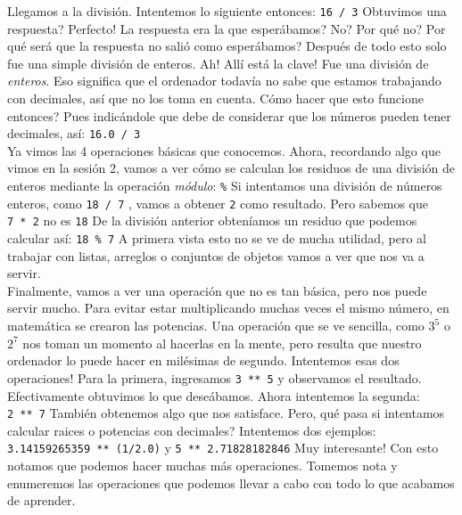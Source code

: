 \documentclass[10pt,letterpaper]{article}
\newcommand{\inlinecode}[1]{
\colorbox{light-gray}{\texttt{#1}}
}
\begin{document}
Llegamos a la divisi\'on. Intentemos lo siguiente entonces: \inlinecode{16\ /\ 3} Obtuvimos una respuesta? Perfecto! La respuesta era la que esper\'abamos? No? Por qu\'e no? Por qu\'e ser\'a que la respuesta no sali\'o como esper\'abamos? Despu\'es de todo esto solo fue una simple divisi\'on de enteros. Ah! All\'i est\'a la clave! Fue una divisi\'on de \emph{enteros}. Eso significa que el ordenador todav\'ia no sabe que estamos trabajando con decimales, as\'i que no los toma en cuenta. C\'omo hacer que esto funcione entonces? Pues indic\'andole que debe de considerar que los n\'umeros pueden tener decimales, as\'i: \inlinecode{16.0\ /\ 3}\\

Ya vimos las 4 operaciones b\'asicas que conocemos. Ahora, recordando algo que vimos en la sesi\'on 2, vamos a ver c\'omo se calculan los residuos de una divisi\'on de enteros mediante la operaci\'on \emph{m\'odulo}: \inlinecode{\%} Si intentamos una divisi\'on de n\'umeros enteros, como \inlinecode{18\ /\ 7}, vamos a obtener \inlinecode{2} como resultado. Pero sabemos que \inlinecode{7\ *\ 2} no es \inlinecode{18} De la divisi\'on anterior obten\'iamos un residuo que podemos calcular as\'i: \inlinecode{18\ \%\ 7} A primera vista esto no se ve de mucha utilidad, pero al trabajar con listas, arreglos o conjuntos de objetos vamos a ver que nos va a servir.\\

Finalmente, vamos a ver una operaci\'on que no es tan b\'asica, pero nos puede servir mucho. Para evitar estar multiplicando muchas veces el mismo n\'umero, en matem\'atica se crearon las potencias. Una operaci\'on que se ve sencilla, como $3^{5}$ o $2^{7}$ nos toman un momento al hacerlas en la mente, pero resulta que nuestro ordenador lo puede hacer en mil\'esimas de segundo. Intentemos esas dos operaciones! Para la primera, ingresamos \inlinecode{3\ **\ 5} y observamos el resultado. Efectivamente obtuvimos lo que dese\'abamos. Ahora intentemos la segunda: \inlinecode{2\ **\ 7} Tambi\'en obtenemos algo que nos satisface. Pero, qu\'e pasa si intentamos calcular raices o potencias con decimales? Intentemos dos ejemplos: \inlinecode{3.14159265359\ **\ (1/2.0)} y \inlinecode{5\ **\ 2.71828182846} Muy interesante! Con esto notamos que podemos hacer muchas m\'as operaciones. Tomemos nota y enumeremos las operaciones que podemos llevar a cabo con todo lo que acabamos de aprender.
\end{document}
